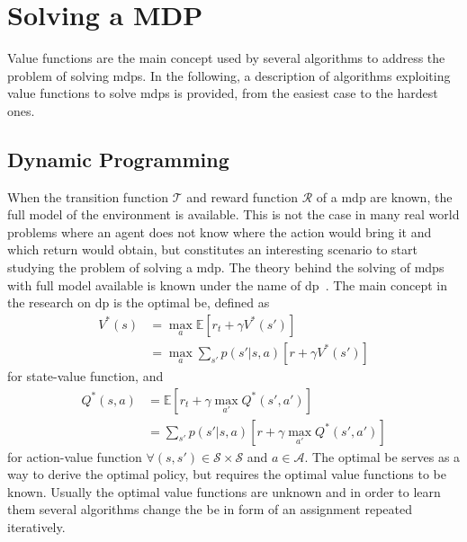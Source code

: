 \section{Solving a MDP}
Value functions are the main concept used by several algorithms to address the problem of solving \glspl{mdp}. In the following, a description of algorithms exploiting value functions to solve \glspl{mdp} is provided, from the easiest case to the hardest ones.

\subsection{Dynamic Programming}
When the transition function $\mathcal{T}$ and reward function $\mathcal{R}$ of a \gls{mdp} are known, the full model of the environment is available. This is not the case in many real world problems where an agent does not know where the action would bring it and which return would obtain, but constitutes an interesting scenario to start studying the problem of solving a \gls{mdp}. The theory behind the solving of \glspl{mdp} with full model available is known under the name of \gls{dp}~\cite{bertsekas2005dynamic, bellman2013dynamic}. The main concept in the research on \gls{dp} is the optimal \gls{be}, defined as
\begin{align}
 V^*(s) &= \max_a \mathbb{E}[r_t + \gamma V^*(s')]\nonumber\\
        &= \max_a \sum_{s'} p(s' | s, a)[r + \gamma V^*(s')]
\end{align}
for state-value function, and
\begin{align}
 Q^*(s,a) &= \mathbb{E}[r_t + \gamma \max_{a'}Q^*(s', a')]\nonumber\\
          &= \sum_{s'} p(s' | s, a)[r + \gamma \max_{a'}Q^*(s', a')]
\end{align}
for action-value function $\forall (s, s') \in \mathcal{S} \times \mathcal{S}$ and $a \in \mathcal{A}$.
The optimal \gls{be} serves as a way to derive the optimal policy, but requires the optimal value functions to be known. Usually the optimal value functions are unknown and in order to learn them several algorithms change the \gls{be} in form of an assignment repeated iteratively.

